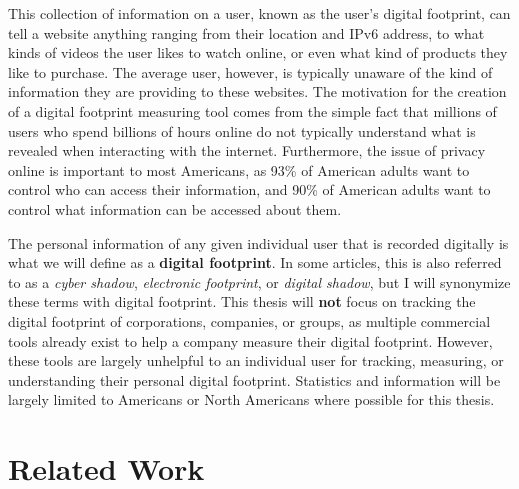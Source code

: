 \documentclass[11pt]{article}
\begin{document}
This collection of information on a user, known as the user's digital footprint, can tell a website anything ranging from their location and IPv6 address, to what kinds of videos the user likes to watch online, or even what kind of products they like to purchase. The average user, however, is typically unaware of the kind of information they are providing to these websites. The motivation for the creation of a digital footprint measuring tool comes from the simple fact that millions of users who spend billions of hours online do not typically understand what is revealed when interacting with the internet. Furthermore, the issue of privacy online is important to most Americans, as 93\% of American adults want to control who can access their information, and 90\% of American adults want to control what information can be accessed about them\cite{pew-internet}.

The personal information of any given individual user that is recorded digitally is what we will define as a {\bf digital footprint}. In some articles, this is also referred to as a {\it cyber shadow}, {\it electronic footprint}, or {\it digital shadow}, but I will synonymize these terms with digital footprint. This thesis will {\bf not} focus on tracking the digital footprint of corporations, companies, or groups, as multiple commercial tools already exist to help a company measure their digital footprint. However, these tools are largely unhelpful to an individual user for tracking, measuring, or understanding their personal digital footprint. Statistics and information will be largely limited to Americans or North Americans where possible for this thesis.

\vspace*{-.1in}
\section{Related Work}
\label{sec:relatedwork}
\vspace*{-.1in}

\end{document}
